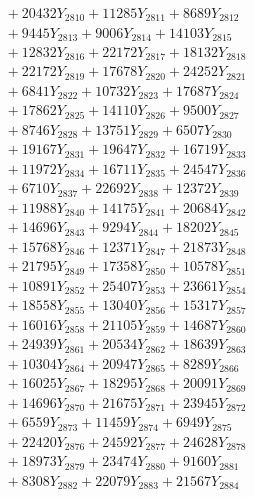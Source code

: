 \documentclass[a4paper,10pt]{article}
\begin{document}
{\begin{align}
&\;  + 20432 Y_{2810} + 11285 Y_{2811} + 8689 Y_{2812} \\[0.3ex]
&\;  + 9445 Y_{2813} + 9006 Y_{2814} + 14103 Y_{2815} \\[0.3ex]
&\;  + 12832 Y_{2816} + 22172 Y_{2817} + 18132 Y_{2818} \\[0.5ex]\allowbreak
&\;  + 22172 Y_{2819} + 17678 Y_{2820} + 24252 Y_{2821} \\[0.3ex]
&\;  + 6841 Y_{2822} + 10732 Y_{2823} + 17687 Y_{2824} \\[0.3ex]
&\;  + 17862 Y_{2825} + 14110 Y_{2826} + 9500 Y_{2827} \\[0.3ex]
&\;  + 8746 Y_{2828} + 13751 Y_{2829} + 6507 Y_{2830} \\[0.3ex]
&\;  + 19167 Y_{2831} + 19647 Y_{2832} + 16719 Y_{2833} \\[0.3ex]
&\;  + 11972 Y_{2834} + 16711 Y_{2835} + 24547 Y_{2836} \\[0.3ex]
&\;  + 6710 Y_{2837} + 22692 Y_{2838} + 12372 Y_{2839} \\[0.3ex]
&\;  + 11988 Y_{2840} + 14175 Y_{2841} + 20684 Y_{2842} \\[0.3ex]
&\;  + 14696 Y_{2843} + 9294 Y_{2844} + 18202 Y_{2845} \\[0.3ex]
&\;  + 15768 Y_{2846} + 12371 Y_{2847} + 21873 Y_{2848} \\[0.5ex]\allowbreak
&\;  + 21795 Y_{2849} + 17358 Y_{2850} + 10578 Y_{2851} \\[0.3ex]
&\;  + 10891 Y_{2852} + 25407 Y_{2853} + 23661 Y_{2854} \\[0.3ex]
&\;  + 18558 Y_{2855} + 13040 Y_{2856} + 15317 Y_{2857} \\[0.3ex]
&\;  + 16016 Y_{2858} + 21105 Y_{2859} + 14687 Y_{2860} \\[0.3ex]
&\;  + 24939 Y_{2861} + 20534 Y_{2862} + 18639 Y_{2863} \\[0.3ex]
&\;  + 10304 Y_{2864} + 20947 Y_{2865} + 8289 Y_{2866} \\[0.3ex]
&\;  + 16025 Y_{2867} + 18295 Y_{2868} + 20091 Y_{2869} \\[0.3ex]
&\;  + 14696 Y_{2870} + 21675 Y_{2871} + 23945 Y_{2872} \\[0.3ex]
&\;  + 6559 Y_{2873} + 11459 Y_{2874} + 6949 Y_{2875} \\[0.3ex]
&\;  + 22420 Y_{2876} + 24592 Y_{2877} + 24628 Y_{2878} \\[0.5ex]\allowbreak
&\;  + 18973 Y_{2879} + 23474 Y_{2880} + 9160 Y_{2881} \\[0.3ex]
&\;  + 8308 Y_{2882} + 22079 Y_{2883} + 21567 Y_{2884} \\[0.3ex]

\end{align}}
\end{document}
